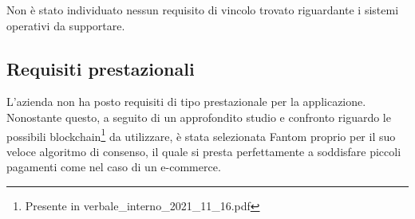 Non è stato individuato nessun requisito di vincolo trovato riguardante i sistemi operativi da supportare.

\subsection{Requisiti prestazionali} \label{subsection:requisiti_prestazionali}

L'azienda non ha posto requisiti di tipo prestazionale per la applicazione.
Nonostante questo, a seguito di un approfondito studio e confronto riguardo le possibili 
blockchain\footnote{Presente in verbale\_interno\_2021\_11\_16.pdf} da utilizzare, è stata selezionata Fantom\glo{} 
proprio per il suo veloce algoritmo di consenso, il quale si presta perfettamente a soddisfare piccoli pagamenti
come nel caso di un e-commerce\glo{}.
